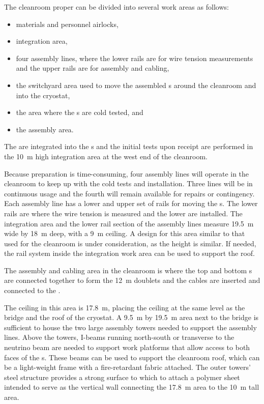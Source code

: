 The cleanroom proper can be divided into several work areas as follows:
\begin{itemize}
    \item materials and personnel airlocks,
    \item {} integration area,
    \item four  assembly lines, where the lower rails are for wire tension measurements and the upper rails are for  assembly and cabling,
    \item the switchyard area used to move the assembled s around the cleanroom and into the cryostat,
    \item the \coldbox area where the s are cold tested, and
    \item the  assembly area.
\end{itemize}




The  are integrated into the s and the initial  tests upon receipt are performed in the \SI{10}{m} high  integration area at the west end of the cleanroom. 


Because  preparation
is time-consuming, four assembly lines will operate in the cleanroom to keep up with the cold tests and installation. 
Three lines will be in continuous usage and the fourth will remain available for repairs or contingency. 
Each assembly line has a lower and upper set of rails for moving the s. The lower rails are where the wire tension is measured and the lower   are installed.  The  integration area and the lower rail section of the assembly lines measure \SI{19.5}{m} wide by \SI{18}{m} deep, with a \SI{9}{m} ceiling. A design for this area similar to that used for the  cleanroom is under consideration, as the height is similar.  If needed, the rail system inside the integration work area can be used to support the roof.
 
The  assembly and cabling area in the cleanroom is where the top and bottom s are connected together to form the \SI{12}{m}  doublets and the  cables are inserted and connected to the . 


The ceiling in this area is \SI{17.8}{m}, placing the ceiling at the same level as the bridge and the roof of the cryostat. 
A \SI{9.5}{m} by \SI{19.5}{m} area next to the bridge is sufficient to house the two large assembly towers needed to support the assembly lines. 
Above the towers, I-beams running north-south or transverse to the neutrino beam are needed to support work platforms that allow access to both faces of the s. 
These beams can be used to support the cleanroom roof, which can be a light-weight frame with a fire-retardant fabric attached. 
The outer towers' steel structure provides a strong surface to which to attach a polymer sheet intended to serve as the vertical wall connecting the \SI{17.8}{m} area to the \SI{10}{m} tall area.

